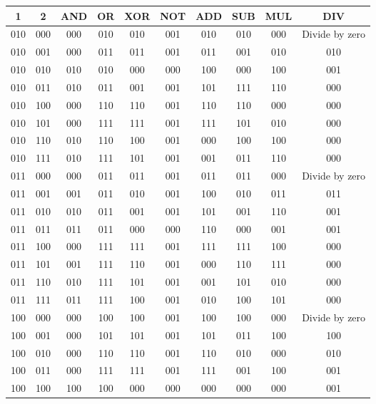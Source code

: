 \documentclass{aiaa-tc}
\begin{document}
 \begin{center}
     \begin{tabular}{ |c|c|c|c|c|c|c|c|c|c| }
     \hline
     1 & 2 & AND & OR & XOR & NOT & ADD & SUB & MUL & DIV  \\ \hline \hline
     010 & 000 & 000 & 010 & 010 & 001 & 010 & 010 & 000 & Divide by zero\\ \hline
     010 & 001 & 000 & 011 & 011 & 001 & 011 & 001 & 010 & 010\\ \hline
     010 & 010 & 010 & 010 & 000 & 000 & 100 & 000 & 100 & 001\\ \hline
     010 & 011 & 010 & 011 & 001 & 001 & 101 & 111 & 110 & 000\\ \hline
     010 & 100 & 000 & 110 & 110 & 001 & 110 & 110 & 000 & 000\\ \hline
     010 & 101 & 000 & 111 & 111 & 001 & 111 & 101 & 010 & 000\\ \hline
     010 & 110 & 010 & 110 & 100 & 001 & 000 & 100 & 100 & 000\\ \hline
     010 & 111 & 010 & 111 & 101 & 001 & 001 & 011 & 110 & 000\\ \hline
     011 & 000 & 000 & 011 & 011 & 001 & 011 & 011 & 000 & Divide by zero\\ \hline
     011 & 001 & 001 & 011 & 010 & 001 & 100 & 010 & 011 & 011\\ \hline
     011 & 010 & 010 & 011 & 001 & 001 & 101 & 001 & 110 & 001\\ \hline
     011 & 011 & 011 & 011 & 000 & 000 & 110 & 000 & 001 & 001\\ \hline
     011 & 100 & 000 & 111 & 111 & 001 & 111 & 111 & 100 & 000\\ \hline
     011 & 101 & 001 & 111 & 110 & 001 & 000 & 110 & 111 & 000\\ \hline
     011 & 110 & 010 & 111 & 101 & 001 & 001 & 101 & 010 & 000\\ \hline
     011 & 111 & 011 & 111 & 100 & 001 & 010 & 100 & 101 & 000\\ \hline
     100 & 000 & 000 & 100 & 100 & 001 & 100 & 100 & 000 & Divide by zero\\ \hline
     100 & 001 & 000 & 101 & 101 & 001 & 101 & 011 & 100 & 100\\ \hline
     100 & 010 & 000 & 110 & 110 & 001 & 110 & 010 & 000 & 010\\ \hline
     100 & 011 & 000 & 111 & 111 & 001 & 111 & 001 & 100 & 001\\ \hline
     100 & 100 & 100 & 100 & 000 & 000 & 000 & 000 & 000 & 001\\ \hline

\end{tabular}
\end{center}
\end{document}

